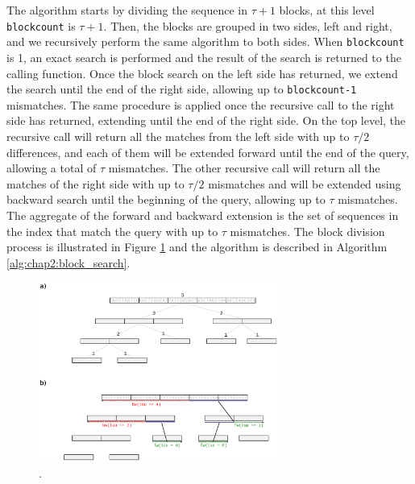 The algorithm starts by dividing the sequence
in $\tau+1$ blocks, at this level \texttt{blockcount} is
$\tau+1$. Then, the blocks are grouped in two sides, left and right, and
we recursively perform the same algorithm to both sides. When
\texttt{blockcount} is 1, an exact search is performed and the result
of the search is returned to the calling function. Once the block
search on the left side has returned, we extend the search until the
end of the right side, allowing up to \texttt{blockcount-1}
mismatches. The same procedure is applied once the recursive call to
the right side has returned, extending until the end of the right
side. On the top level, the recursive call will return all the matches
from the left side with up to $\tau/2$ differences, and each of them
will be extended forward until the end of the query, allowing a total
of $\tau$ mismatches. The other recursive call will return all the
matches of the right side with up to $\tau/2$ mismatches and will be
extended using backward search until the beginning of the query,
allowing up to $\tau$ mismatches. The aggregate of the forward and
backward extension is the set of sequences in the index that match the
query with up to $\tau$ mismatches. The block division process is
illustrated in Figure \ref{fig:chap2:block_search} and the algorithm
is described in Algorithm \ref{alg:chap2:block_search}.

\begin{figure}[h]
	\begin{minipage}[b]{\linewidth}
	  \centering
	  \includegraphics*[width=0.7\textwidth]{figures/chap2_block_search}
	  \caption{.}
	  \label{fig:chap2:block_search}
   \end{minipage}
\end{figure}

